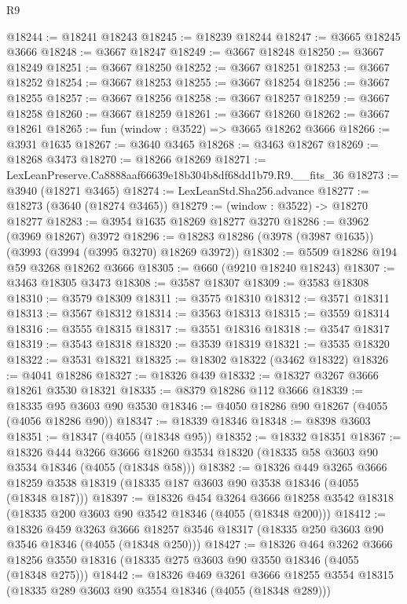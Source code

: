 \begin{lexlean}{R9}
\begin{coremodule}
@18244 := @18241 @18243
@18245 := @18239 @18244
@18247 := @3665 @18245 @3666
@18248 := @3667 @18247
@18249 := @3667 @18248
@18250 := @3667 @18249
@18251 := @3667 @18250
@18252 := @3667 @18251
@18253 := @3667 @18252
@18254 := @3667 @18253
@18255 := @3667 @18254
@18256 := @3667 @18255
@18257 := @3667 @18256
@18258 := @3667 @18257
@18259 := @3667 @18258
@18260 := @3667 @18259
@18261 := @3667 @18260
@18262 := @3667 @18261
@18265 := fun (window : @3522) => @3665 @18262 @3666
@18266 := @3931 @1635
@18267 := @3640 @3465
@18268 := @3463 @18267
@18269 := @18268 @3473
@18270 := @18266 @18269
@18271 := LexLeanPreserve.Ca8888aaf66639e18b304b8df68dd1b79.R9.__fits_36
@18273 := @3940 (@18271 @3465)
@18274 := LexLeanStd.Sha256.advance
@18277 := @18273 (@3640 (@18274 @3465))
@18279 := (window : @3522) -> @18270 @18277
@18283 := @3954 @1635 @18269 @18277 @3270
@18286 := @3962 (@3969 @18267) @3972
@18296 := @18283 @18286 (@3978 (@3987 @1635)) (@3993 (@3994 (@3995 @3270) @18269 @3972))
@18302 := @5509 @18286 @194 @59 @3268 @18262 @3666
@18305 := @660 (@9210 @18240 @18243)
@18307 := @3463 @18305 @3473
@18308 := @3587 @18307
@18309 := @3583 @18308
@18310 := @3579 @18309
@18311 := @3575 @18310
@18312 := @3571 @18311
@18313 := @3567 @18312
@18314 := @3563 @18313
@18315 := @3559 @18314
@18316 := @3555 @18315
@18317 := @3551 @18316
@18318 := @3547 @18317
@18319 := @3543 @18318
@18320 := @3539 @18319
@18321 := @3535 @18320
@18322 := @3531 @18321
@18325 := @18302 @18322 (@3462 @18322)
@18326 := @4041 @18286
@18327 := @18326 @439
@18332 := @18327 @3267 @3666 @18261 @3530 @18321
@18335 := @8379 @18286 @112 @3666
@18339 := @18335 @95 @3603 @90 @3530
@18346 := @4050 @18286 @90 @18267 (@4055 (@4056 @18286 @90))
@18347 := @18339 @18346
@18348 := @8398 @3603
@18351 := @18347 (@4055 (@18348 @95))
@18352 := @18332 @18351
@18367 := @18326
    @444
    @3266
    @3666
    @18260
    @3534
    @18320
    (@18335 @58 @3603 @90 @3534 @18346 (@4055 (@18348 @58)))
@18382 := @18326
    @449
    @3265
    @3666
    @18259
    @3538
    @18319
    (@18335 @187 @3603 @90 @3538 @18346 (@4055 (@18348 @187)))
@18397 := @18326
    @454
    @3264
    @3666
    @18258
    @3542
    @18318
    (@18335 @200 @3603 @90 @3542 @18346 (@4055 (@18348 @200)))
@18412 := @18326
    @459
    @3263
    @3666
    @18257
    @3546
    @18317
    (@18335 @250 @3603 @90 @3546 @18346 (@4055 (@18348 @250)))
@18427 := @18326
    @464
    @3262
    @3666
    @18256
    @3550
    @18316
    (@18335 @275 @3603 @90 @3550 @18346 (@4055 (@18348 @275)))
@18442 := @18326
    @469
    @3261
    @3666
    @18255
    @3554
    @18315
    (@18335 @289 @3603 @90 @3554 @18346 (@4055 (@18348 @289)))

\end{coremodule}
\end{lexlean}
